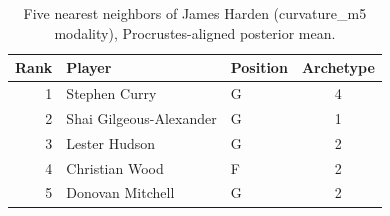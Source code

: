 \begin{table}[htbp]
  \centering\small
  \begin{tabular}{rllc}
    \toprule
    Rank & Player & Position & Archetype \\
    \midrule
    1 & Stephen Curry & G & 4 \\
    2 & Shai Gilgeous-Alexander & G & 1 \\
    3 & Lester Hudson & G & 2 \\
    4 & Christian Wood & F & 2 \\
    5 & Donovan Mitchell & G & 2 \\
    \bottomrule
  \end{tabular}
  \caption{Five nearest neighbors of James Harden (curvature_m5 modality), Procrustes-aligned posterior mean.}
  \label{tab:James_Harden_neighbors_curvature_m5}
\end{table}


